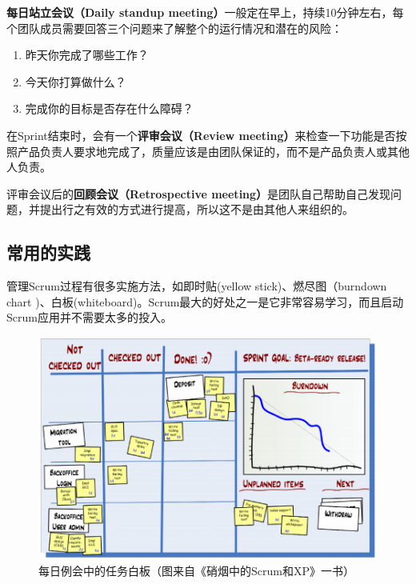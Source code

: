 \textbf{每日站立会议（Daily standup meeting）}一般定在早上，持续10分钟左右，每个团队成员需要回答三个问题来了解整个的运行情况和潜在的风险：

\begin{enumerate}
\item 昨天你完成了哪些工作？

\item 今天你打算做什么？

\item 完成你的目标是否存在什么障碍？

\end{enumerate}

在Sprint结束时，会有一个\textbf{评审会议（Review meeting）}来检查一下功能是否按照产品负责人要求地完成了，质量应该是由团队保证的，而不是产品负责人或其他人负责。

评审会议后的\textbf{回顾会议（Retrospective meeting）}是团队自己帮助自己发现问题，并提出行之有效的方式进行提高，所以这不是由其他人来组织的。

\subsection{常用的实践}
\label{常用的实践}

管理Scrum过程有很多实施方法，如即时贴(yellow stick)、燃尽图（burndown chart )、白板(whiteboard)。Scrum最大的好处之一是它非常容易学习，而且启动Scrum应用并不需要太多的投入。

\begin{figure}[htbp]
\centering
\includegraphics[keepaspectratio,width=\textwidth,height=0.75\textheight]{img/18333fig0103-tn.png}
\caption{每日例会中的任务白板（图来自《硝烟中的Scrum和XP》一书）}
\end{figure}

